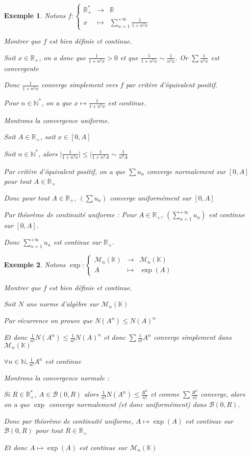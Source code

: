 \documentclass[a4paper,12pt]{book}
\newtheorem{Exe}{Exemple}[section]
\def\R{\mathbb{R}}
\def\N{\mathbb{N}}
\def\K{\mathbb{K}}
\begin{document}
\begin{Exe}
Notons $f:\left\{\begin{array}{rcl} \R_+^* & \to & \R \\ x & \mapsto & \sum\limits_{n=1}^{+\infty}\frac{1}{1+n^2x}\end{array}\right.$ \par Montrer que $f$ est bien définie et continue. \par Soit $x\in\R_+$, on a donc que $\frac{1}{1+n^2x}>0$ et que $\frac{1}{1+n^2x}\sim\frac{1}{n^2x}$. Or $\sum \frac{1}{n^2x}$ est convergente \par Donc $\frac{1}{1+n^2x}$ converge simplement vers $f$ par critère d'équivalent positif. \par Pour $n\in\N^*$, on a que $x\mapsto \frac{1}{1+n^2x}$ est continue.\par Montrons la convergence uniforme.
\par Soit $A\in\R_+$, soit $x\in [0,A]$ \par Soit $n\in\N^*$, alors $\vert \frac{1}{1+n^2x}\vert\leq \vert\frac{1}{1+n^2A}\sim \frac{1}{n^2A}$ \par Par critère d'équivalent positif, on a que $\sum u_n$ converge normalement sur $[0,A]$ pour tout $A\in\R_+$ \par Donc pour tout $A\in\R_+$, $(\sum u_n)$ converge uniformément sur $[0,A]$ \par Par théorème de continuité uniforme : Pour $A\in\R_+$, $(\sum\limits_{n=1}^{+\infty}u_n)$ est continue sur $[0,A]$.
\par Donc $\sum\limits_{n=1}^{+\infty}u_n$ est continue sur $\R_+$.
\end{Exe}
\begin{Exe}
Notons $\exp:\left\{\begin{array}{rcl} \mathcal{M}_n(\K) & \to & \mathcal{M}_n(\K) \\ A & \mapsto & \exp(A)\end{array}\right.$ \par Montrer que $f$ est bien définie et continue. \par Soit $N$ une norme d'algèbre sur $\mathcal{M}_n(\K)$ \par Par récurrence on prouve que $N(A^n)\leq N(A)^n$ \par Et donc $\frac{1}{n!}N(A^n)\leq \frac{1}{n!}N(A)^n$ et donc $\sum\frac{1}{n!}A^n$ converge simplement dans $\mathcal{M}_n(\K)$
\par $\forall n\in\N, \frac{1}{n!}A^n$ est continue \par Montrons la convergence normale : \par Si $R\in\R_+^*$, $A\in\mathcal{B}(0,R)$ alors $\frac{1}{n!}N(A^n)\leq \frac{R^n}{n!}$ et comme $\sum \frac{R^n}{n!}$ converge, alors on a que $\exp$ converge normalement (et donc uniformément) dans $\mathcal{B}(0,R)$. \par Donc par théorème de continuité uniforme, $A\mapsto \exp(A)$ est continue sur $\mathcal{B}(0,R)$ pour tout $R\in\R_+$ \par Et donc $A\mapsto\exp(A)$ est continue sur $\mathcal{M}_n(\K)$
\end{Exe}    
\end{document}
